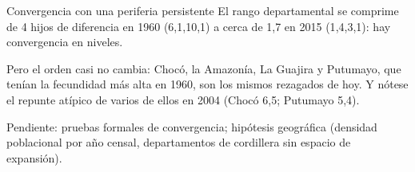 \documentclass[11pt,aspectratio=169]{beamer}
\begin{document}
\begin{frame}{Convergencia con una periferia persistente}
El rango departamental se comprime de 4 hijos de diferencia en 1960
(6{,}1,10{,}1) a cerca de 1{,}7 en 2015 (1{,}4,3{,}1): hay
convergencia en niveles.
\bigskip

Pero el \alert{orden casi no cambia}: Choc\'o, la Amazon\'ia, La
Guajira y Putumayo, que ten\'ian la fecundidad m\'as alta en 1960, son
los mismos rezagados de hoy. Y n\'otese el repunte at\'ipico de varios
de ellos en 2004 (Choc\'o 6{,}5; Putumayo 5{,}4).
\bigskip

{\small Pendiente: pruebas formales de convergencia; hip\'otesis
geogr\'afica (densidad poblacional por a\~no censal, departamentos de
cordillera sin espacio de expansi\'on).}
\end{frame}
\end{document}
